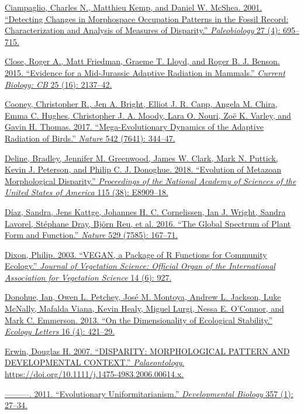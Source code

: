 \href{http://paperpile.com/b/sTGYvp/ROH8}{Ciampaglio, Charles N.,
Matthieu Kemp, and Daniel W. McShea. 2001. ``Detecting Changes in
Morphospace Occupation Patterns in the Fossil Record: Characterization
and Analysis of Measures of Disparity.'' \emph{Paleobiology} 27 (4):
695--715.}

\href{http://paperpile.com/b/sTGYvp/PbSx}{Close, Roger A., Matt
Friedman, Graeme T. Lloyd, and Roger B. J. Benson. 2015. ``Evidence for
a Mid-Jurassic Adaptive Radiation in Mammals.'' \emph{Current Biology:
CB} 25 (16): 2137--42.}

\href{http://paperpile.com/b/sTGYvp/RjqE}{Cooney, Christopher R., Jen A.
Bright, Elliot J. R. Capp, Angela M. Chira, Emma C. Hughes, Christopher
J. A. Moody, Lara O. Nouri, Zoë K. Varley, and Gavin H. Thomas. 2017.
``Mega-Evolutionary Dynamics of the Adaptive Radiation of Birds.''
\emph{Nature} 542 (7641): 344--47.}

\href{http://paperpile.com/b/sTGYvp/0y4V}{Deline, Bradley, Jennifer M.
Greenwood, James W. Clark, Mark N. Puttick, Kevin J. Peterson, and
Philip C. J. Donoghue. 2018. ``Evolution of Metazoan Morphological
Disparity.'' \emph{Proceedings of the National Academy of Sciences of
the United States of America} 115 (38): E8909--18.}

\href{http://paperpile.com/b/sTGYvp/47fI}{Díaz, Sandra, Jens Kattge,
Johannes H. C. Cornelissen, Ian J. Wright, Sandra Lavorel, Stéphane
Dray, Björn Reu, et al. 2016. ``The Global Spectrum of Plant Form and
Function.'' \emph{Nature} 529 (7585): 167--71.}

\href{http://paperpile.com/b/sTGYvp/2KmX}{Dixon, Philip. 2003. ``VEGAN,
a Package of R Functions for Community Ecology.'' \emph{Journal of
Vegetation Science: Official Organ of the International Association for
Vegetation Science} 14 (6): 927.}

\href{http://paperpile.com/b/sTGYvp/krNU}{Donohue, Ian, Owen L. Petchey,
José M. Montoya, Andrew L. Jackson, Luke McNally, Mafalda Viana, Kevin
Healy, Miguel Lurgi, Nessa E. O'Connor, and Mark C. Emmerson. 2013. ``On
the Dimensionality of Ecological Stability.'' \emph{Ecology Letters} 16
(4): 421--29.}

\href{http://paperpile.com/b/sTGYvp/EPJ2}{Erwin, Douglas H. 2007.
``DISPARITY: MORPHOLOGICAL PATTERN AND DEVELOPMENTAL CONTEXT.''
\emph{Palaeontology}.
https://doi.org/}\href{http://dx.doi.org/10.1111/j.1475-4983.2006.00614.x}{10.1111/j.1475-4983.2006.00614.x}\href{http://paperpile.com/b/sTGYvp/EPJ2}{.}

\href{http://paperpile.com/b/sTGYvp/Z6l6}{---------. 2011.
``Evolutionary Uniformitarianism.'' \emph{Developmental Biology} 357
(1): 27--34.}


